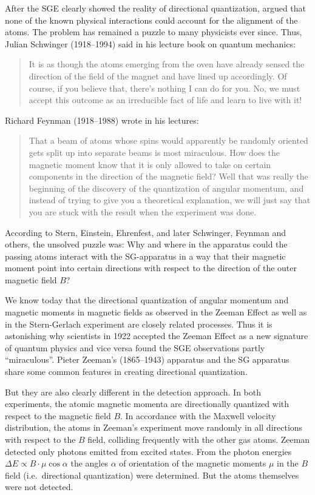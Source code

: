 \documentclass{article}
\begin{document}
After the SGE clearly showed the reality of directional quantization, \cite{EinsteinAEtAl1922Bemerkungen} argued that none of the known physical interactions could account for the alignment of the atoms. The problem has remained a puzzle to many physicists ever since. 
Thus, Julian Schwinger (1918--1994) said in his lecture book on quantum mechanics:
\begin{quote}
It is as though the atoms emerging from the oven have already sensed the direction of the field of the magnet and have lined up accordingly. Of course, if you believe that, there's nothing I can do for you. No, we must accept this outcome as an irreducible fact of life and learn to live with it! 
\cite[p.~30]{SchwingerJ2001Mechanics}
\end{quote}
Richard Feynman (1918--1988) wrote in his lectures: 
\begin{quote}
That a beam of atoms whose spins would apparently be randomly oriented gets split up into separate beams is most miraculous. How does the magnetic moment know that it is only allowed to take on certain components in the direction of the magnetic field? Well that was really the beginning of the discovery of the quantization of angular momentum, and instead of trying to give you a theoretical explanation, we will just say that you are stuck with the result when the experiment was done.  
\cite[Vol.II, 35-2]{FeynmanR1963Lectures}
\end{quote}
According to Stern, Einstein, Ehrenfest, and later Schwinger, Feynman and others, the unsolved puzzle was: Why and where in the apparatus could the passing atoms interact with the SG-apparatus in a way that their magnetic moment point into certain directions with respect to the direction of the outer magnetic field $B$?  

We know today that the directional quantization of angular momentum and magnetic moments in magnetic fields as observed in the Zeeman Effect \citep{ZeemanP1896Invloed,ZeemanP1897Influence} as well as in the Stern-Gerlach experiment are closely related processes. Thus it is astonishing why scientists in 1922 accepted the Zeeman Effect as a new signature of quantum physics and vice versa found the SGE observations partly ``miraculous''. Pieter Zeeman's (1865--1943) apparatus and the SG apparatus share some common features in creating directional quantization. 

But they are also clearly different in the detection approach. In both experiments, the atomic magnetic momenta are directionally quantized with respect to the magnetic field $B$. In accordance with the Maxwell velocity distribution, the atoms in Zeeman's experiment move randomly in all directions with respect to the $B$ field, colliding frequently with the other gas atoms. Zeeman detected only photons emitted from excited states. From the photon energies $\Delta E \propto B\cdot \mu\cos\alpha$ the angles $\alpha$ of orientation of the magnetic moments $\mu$ in the $B$ field (i.e.\ directional quantization) were determined. But the atoms themselves were not detected. 
\end{document}
